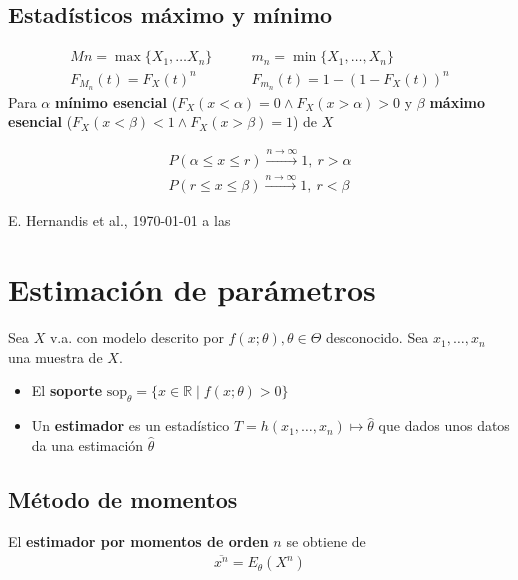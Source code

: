 \documentclass[a4paper,twocolumn]{extarticle}
\theoremstyle{remark}
\newcommand{\R}{\mathbb{R}}
\begin{document}
\subsection{Estadísticos máximo y mínimo}

\begin{align*}
	Mn = \max\{X_1, \dots X_n\} &\qquad m_n = \min \{X_1, \dots, X_n\} \\
	F_{M_n}(t) = F_X(t)^n &\qquad F_{m_n}(t) = 1 - (1 - F_X(t))^n
\end{align*}
Para $\alpha$ \textbf{mínimo esencial} ($F_X(x < \alpha) = 0 \land F_X(x > \alpha) > 0$ y $\beta$ \textbf{máximo esencial} ($F_X(x < \beta) < 1 \land F_X(x > \beta) = 1$)  de $X$

\begin{align*}
P(\alpha \leq x \leq r) \xrightarrow{n \to \infty} 1,\ r > \alpha \\
P(r \leq x \leq \beta) \xrightarrow{n \to \infty} 1,\ r < \beta
\end{align*}
\begin{flushright}
	E. Hernandis et al., \today $ $ a las \currenttime
\end{flushright}

\section{Estimación de parámetros}

Sea $X$ v.a. con modelo descrito por $f(x; \theta), \theta \in \Theta$ desconocido. Sea $x_1, \dots, x_n$ una muestra de $X$.

\begin{itemize}
	\item El \textbf{soporte} $\text{sop}_\theta = \{x \in \R \mid f(x; \theta) > 0\}$
	\item Un \textbf{estimador} es un estadístico $T = h(x_1, \dots, x_n) \mapsto \widehat{\theta}$ que dados unos datos da una estimación $\widehat{\theta}$
\end{itemize}

\subsection{Método de momentos}
El \textbf{estimador por momentos de orden} $n$ se obtiene de
\begin{align*}
	\overline{x^n} = E_\theta(X^n)
\end{align*}
\end{document}
